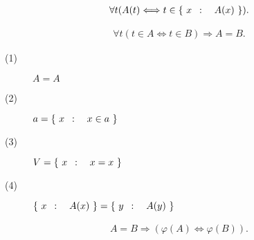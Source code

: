 	\begin{comment}
	\begin{itembox}[l]{研究室にて}
		ポスドク「現代的な数学では，数や関数など数学に関するあらゆるものは集合で構成されるのだね．
		そして集合そのものは述語論理を基礎にして公理的に規定される．
		この意味で集合論の勉強には論理学の知識が必要であると聞くけれども，
		真に受けて論理学の本を眺めてみれば，変数に数で添え字をつけたり，
		関数や$k$項述語などといったものを取り扱っているのが散見するのが残念だ．
		モノの数え方すら知らない生まれたばかりの世界に立って色々説明しようというのに，
		その前準備の段階で数の存在を予定したり関数の概念を前借りしてしまうのは好ましくないし，
		そのように集合論と論理学が循環しているのは勉強する側にとってはただの障壁にしかならない．
		どのみち両者は切り離せないのだから，同時に並行して記述する方がやりやすいのではないだろうか．」
	\end{itembox}
	\end{comment}
	
	\begin{screen}
		\begin{axm}[類の公理]
			\begin{align}
				\forall t(A(t) \Longleftrightarrow t \in \left\{\ x\ \, : \quad A(x)\ \right\}).
			\end{align}
		\end{axm}
	\end{screen}
	
	\begin{screen}
		\begin{axm}[外延性の公理]
			\begin{align}
				\forall t(t \in A  \Longleftrightarrow t \in B)
				\Longrightarrow A=B.
			\end{align}
		\end{axm}
	\end{screen}
	
	\begin{screen}
		\begin{thm}
			\begin{description}
				\item[(1)] $A=A$
				\item[(2)] $a = \left\{\ x\ \, : \quad x \in a\ \right\}$
				\item[(3)] $V=\left\{\ x\ \, : \quad x=x\ \right\}$
				\item[(4)] $\left\{\ x\ \, : \quad A(x)\ \right\} = \left\{\ y\ \, : \quad A(y)\ \right\}$
			\end{description}
		\end{thm}
	\end{screen}
	
	\begin{screen}
		\begin{axm}[相等性の公理]
			\begin{align}
				A=B \Longrightarrow (\varphi(A) \Longleftrightarrow \varphi(B)).
			\end{align}
		\end{axm}
	\end{screen}
	
